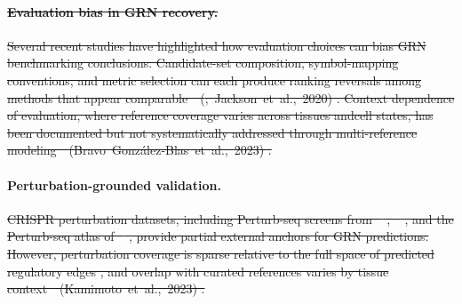 \documentclass[11pt,a4paper]{article}
\providecommand{\DIFdeltex}[1]{{\protect\color{red}\sout{#1}}}                      %
\providecommand{\DIFdelbegin}{} %
\providecommand{\DIFdelend}{} %
\providecommand{\DIFdel}[1]{\texorpdfstring{\DIFdeltex{#1}}{}} %
\newcommand{\DIFscaledelfig}{0.5}
\newlength{\DIFdelgraphicswidth} %
\newlength{\DIFdelgraphicsheight} %
\newcommand{\DIFdelincludegraphics}[2][]{%
\sbox{\DIFdelgraphicsbox}{\DIFOincludegraphics[#1]{#2}}%
\settoboxwidth{\DIFdelgraphicswidth}{\DIFdelgraphicsbox} %
\settoboxtotalheight{\DIFdelgraphicsheight}{\DIFdelgraphicsbox} %
\scalebox{\DIFscaledelfig}{%
\parbox[b]{\DIFdelgraphicswidth}{\usebox{\DIFdelgraphicsbox}\\[-\baselineskip] \rule{\DIFdelgraphicswidth}{0em}}\llap{\resizebox{\DIFdelgraphicswidth}{\DIFdelgraphicsheight}{%
\setlength{\unitlength}{\DIFdelgraphicswidth}%
\begin{picture}(1,1)%
\thicklines\linethickness{2pt} %
{\color[rgb]{1,0,0}\put(0,0){\framebox(1,1){}}}%
{\color[rgb]{1,0,0}\put(0,0){\line( 1,1){1}}}%
{\color[rgb]{1,0,0}\put(0,1){\line(1,-1){1}}}%
\end{picture}%
}\hspace*{3pt}}} %
} %
\DeclareRobustCommand{\DIFdelbegin}{\DIFOdelbegin \let\includegraphics\DIFdelincludegraphics} %
\DeclareRobustCommand{\DIFdelend}{\DIFOaddend \let\includegraphics\DIFOincludegraphics} %
\begin{document}
\DIFdelbegin \paragraph{\DIFdel{Evaluation bias in GRN recovery.}}
\addtocounter{paragraph}{-1}%
\DIFdel{Several recent studies have highlighted how evaluation choices can bias GRN benchmarking conclusions.
Candidate-set composition, symbol-mapping conventions, and metric selection can each produce ranking reversals among methods that appear comparable~\mbox{%
(\citealp{pratapa2020benchmarking}; Jackson et~al., 2020)}\hskip0pt%
.
Context dependence of evaluation, where reference coverage varies across tissues andcell states, has been documented but not systematically addressed through multi-reference modeling~\mbox{%
(Bravo Gonz{\'a}lez-Blas et~al., 2023)}\hskip0pt%
.
}%

\DIFdelend \paragraph{Perturbation-grounded validation.}
\DIFdelbegin \DIFdel{CRISPR perturbation datasets, including Perturb-seq screens from \mbox{%
\citet{dixit2016perturb}}\hskip0pt%
, \mbox{%
\citet{adamson2016multiplexed}}\hskip0pt%
, and the Perturb-seq atlas of \mbox{%
\citet{replogle2022mapping}}\hskip0pt%
, provide partial external anchors for GRN predictions.
However, perturbation coverage is
sparse relative to the full space of predicted regulatory edges , and overlap with curated references varies by tissue context~\mbox{%
(Kamimoto et~al., 2023)}\hskip0pt%
.
}%
\end{document}
